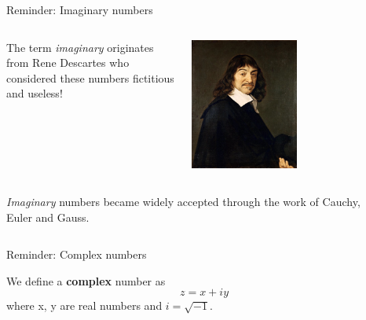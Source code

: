 {\begin{frame}{Reminder: Imaginary numbers}
\begin{columns}
  \begin{column}{0.75\textwidth}
   {\small
      The term {\em imaginary} originates from Rene Descartes who considered these
      numbers fictitious and useless!\\
   }
  \end{column}
  \begin{column}{0.25\textwidth}
    \begin{center}
      \includegraphics[width=0.50\textwidth]{./images/people/descartes.jpg}
    \end{center}
  \end{column}
\end{columns}


\begin{columns}
  \begin{column}{0.75\textwidth}
   {\small
      {\em Imaginary} numbers became widely accepted through the work of Cauchy, Euler and Gauss.\\
   }
  \end{column}
  \begin{column}{0.25\textwidth}
  \end{column}
\end{columns}

\end{frame}


%
%
%

\begin{frame}{Reminder: Complex numbers}

We define a {\bf complex} number as
\begin{equation*}
  z = x + i y
\end{equation*}
where x, y are real numbers and $i=\sqrt{-1}$.\\


\end{frame}}
